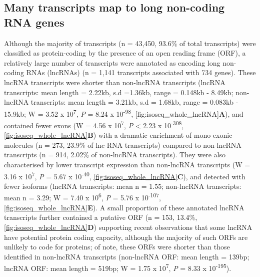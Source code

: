 \subsection{Many transcripts map to long non-coding RNA genes}
Although the majority of transcripts (n = 43,450, 93.6\% of total transcripts) were classified as protein-coding by the presence of an open reading frame (ORF), a relatively large number of transcripts were annotated as encoding long non-coding RNAs (lncRNAs) (n = 1,141 transcripts associated with 734 genes). These lncRNA transcripts were shorter than non-lncRNA transcripts (lncRNA transcripts: mean length = 2.22kb, s.d =1.36kb, range = 0.148kb - 8.49kb; non-lncRNA transcripts: mean length = 3.21kb, s.d = 1.68kb, range = 0.083kb - 15.9kb; W = 3.52 x 10\textsuperscript{7}, \textit{P} = 8.24 x 10\textsuperscript{-98}, \cref{fig:isoseq_whole_lncRNA}\textbf{A}), and contained fewer exons\cite{Statello2020} (W = 4.56 x 10\textsuperscript{7}, \textit{P} < 2.23 x 10\textsuperscript{-308}, \cref{fig:isoseq_whole_lncRNA}\textbf{B}) with a dramatic enrichment of mono-exonic molecules\cite{Kuo2017} (n = 273, 23.9\% of lnc-RNA transcripts) compared to non-lncRNA transcripts (n = 914, 2.02\% of non-lncRNA transcripts). They were also characterised by lower transcript expression than non-lncRNA transcripts \cite{Statello2020, Liu2016a} (W = 3.16 x 10\textsuperscript{7}, \textit{P} = 5.67 x 10\textsuperscript{-40}, \cref{fig:isoseq_whole_lncRNA}\textbf{C}), and detected with fewer isoforms (lncRNA transcripts: mean n = 1.55; non-lncRNA transcripts: mean n = 3.29; W = 7.40 x 10\textsuperscript{6}, \textit{P} = 5.76 x 10\textsuperscript{-107}, \cref{fig:isoseq_whole_lncRNA}\textbf{E}). A small proportion of these annotated lncRNA transcripts further contained a putative ORF (n = 153, 13.4\%, \cref{fig:isoseq_whole_lncRNA}\textbf{D}) supporting recent observations that some lncRNA have potential protein coding capacity\cite{Kageyama2011}, although the majority of such ORFs are unlikely to code for proteins\cite{Guttman2013}; of note, these ORFs were shorter than those identified in non-lncRNA transcripts (non-lncRNA ORF: mean length = 139bp; lncRNA ORF: mean length = 519bp; W = 1.75 x 10\textsuperscript{7}, \textit{P} = 8.33 x 10\textsuperscript{-195}). 

